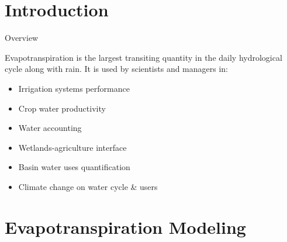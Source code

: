 \documentclass[xcolor=dvipsnames,beamer]{beamer} %
\begin{document}
\section{Introduction}
\begin{frame}[fragile]{Overview}

Evapotranspiration is the largest transiting quantity in the daily 
hydrological cycle along with rain. It is used by scientists and
managers in:
\newline\linebreak

\begin{itemize}
 \item Irrigation systems performance
 \item Crop water productivity
 \item Water accounting
 \item Wetlands-agriculture interface
 \item Basin water uses quantification
 \item Climate change on water cycle \& users
\end{itemize}
\end{frame}

\section{Evapotranspiration Modeling}
\end{document}
